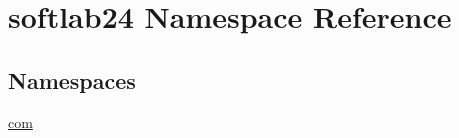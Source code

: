 \hypertarget{namespacesoftlab24}{}\section{softlab24 Namespace Reference}
\label{namespacesoftlab24}
\subsection*{Namespaces}
\begin{DoxyCompactItemize}
\item 
 \hyperlink{namespacesoftlab24_1_1com}{com}
\end{DoxyCompactItemize}
